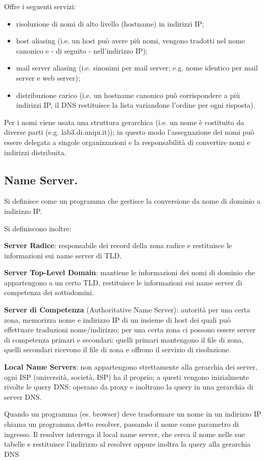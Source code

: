 \documentclass[11pt, italian, openany]{book}
\begin{document}
\begin{sloppypar}
Offre i seguenti servizi:
\begin{itemize}[topsep=0pt]
	\itemsep-0.3em
	\item risoluzione di nomi di alto livello (hostname) in indirizzi IP;
	\item host aliasing (i.e. un host può avere più nomi, vengono tradotti nel nome canonico e - di seguito - nell'indirizzo IP);
	\item mail server aliasing (i.e. sinonimi per mail server; e.g. nome identico per mail server e web server);
	\item distribuzione carico (i.e. un hostname canonico può corrispondere a più indirizzi IP, il DNS restituisce la lista variandone l'ordine per ogni risposta).
\end{itemize}

Per i nomi viene usata una struttura gerarchica (i.e. un nome è costituito da diverse parti (e.g. lab3.di.unipi.it)); in questo modo
l'assegnazione dei nomi può essere delegata a singole organizzazioni e la responsabilità di convertire nomi e indirizzi distribuita.

\subsection*{Name Server.}
Si definisce come un programma che gestisce la conversione da nome di dominio a indirizzo IP.

Si definiscono inoltre:

\textbf{Server Radice}: responsabile dei record della zona radice e restituisce le informazioni sui name server di TLD.

\textbf{Server Top-Level Domain}: mantiene le informazioni dei nomi di dominio che appartengono a un certo TLD, restituisce le informazioni
sui name server di competenza dei sottodomini.

\textbf{Server di Competenza} (Authoritative Name Server): autorità per una certa zona, memorizza nome e indirizzo IP di un insieme di host dei
quali può effettuare traduzioni nome/indirizzo; per una certa zona ci possono essere server di competenza primari e secondari:
quelli primari mantengono il file di zona, quelli secondari ricevono il file di zona e offrono il servizio di risoluzione.

\textbf{Local Name Servers}: non appartengono strettamente alla gerarchia dei server, ogni ISP (università, società, ISP) ha il proprio; a questi
vengono inizialmente rivolte le query DNS: operano da proxy e inoltrano la query in una gerarchia di server DNS.

Quando un programma (es. browser) deve trasformare un nome in
un indirizzo IP chiama un programma detto resolver, passando il
nome come parametro di ingresso.
Il resolver interroga il local name server, che cerca il nome nelle sue
tabelle e restituisce l’indirizzo al resolver oppure inoltra la query
alla gerarchia DNS


\end{sloppypar}
\end{document}
